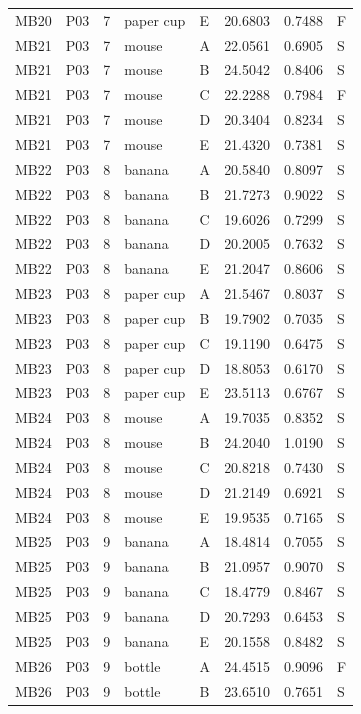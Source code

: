 \documentclass[11pt]{article}
\begin{document}
\begin{longtable}{lll llrrl}
MB20 & P03 & 7 & paper cup & E & 20.6803 & 0.7488 & F \\
MB21 & P03 & 7 & mouse & A & 22.0561 & 0.6905 & S \\
MB21 & P03 & 7 & mouse & B & 24.5042 & 0.8406 & S \\
MB21 & P03 & 7 & mouse & C & 22.2288 & 0.7984 & F \\
MB21 & P03 & 7 & mouse & D & 20.3404 & 0.8234 & S \\
MB21 & P03 & 7 & mouse & E & 21.4320 & 0.7381 & S \\
MB22 & P03 & 8 & banana & A & 20.5840 & 0.8097 & S \\
MB22 & P03 & 8 & banana & B & 21.7273 & 0.9022 & S \\
MB22 & P03 & 8 & banana & C & 19.6026 & 0.7299 & S \\
MB22 & P03 & 8 & banana & D & 20.2005 & 0.7632 & S \\
MB22 & P03 & 8 & banana & E & 21.2047 & 0.8606 & S \\
MB23 & P03 & 8 & paper cup & A & 21.5467 & 0.8037 & S \\
MB23 & P03 & 8 & paper cup & B & 19.7902 & 0.7035 & S \\
MB23 & P03 & 8 & paper cup & C & 19.1190 & 0.6475 & S \\
MB23 & P03 & 8 & paper cup & D & 18.8053 & 0.6170 & S \\
MB23 & P03 & 8 & paper cup & E & 23.5113 & 0.6767 & S \\
MB24 & P03 & 8 & mouse & A & 19.7035 & 0.8352 & S \\
MB24 & P03 & 8 & mouse & B & 24.2040 & 1.0190 & S \\
MB24 & P03 & 8 & mouse & C & 20.8218 & 0.7430 & S \\
MB24 & P03 & 8 & mouse & D & 21.2149 & 0.6921 & S \\
MB24 & P03 & 8 & mouse & E & 19.9535 & 0.7165 & S \\
MB25 & P03 & 9 & banana & A & 18.4814 & 0.7055 & S \\
MB25 & P03 & 9 & banana & B & 21.0957 & 0.9070 & S \\
MB25 & P03 & 9 & banana & C & 18.4779 & 0.8467 & S \\
MB25 & P03 & 9 & banana & D & 20.7293 & 0.6453 & S \\
MB25 & P03 & 9 & banana & E & 20.1558 & 0.8482 & S \\
MB26 & P03 & 9 & bottle & A & 24.4515 & 0.9096 & F \\
MB26 & P03 & 9 & bottle & B & 23.6510 & 0.7651 & S \\

\end{longtable}
\end{document}
